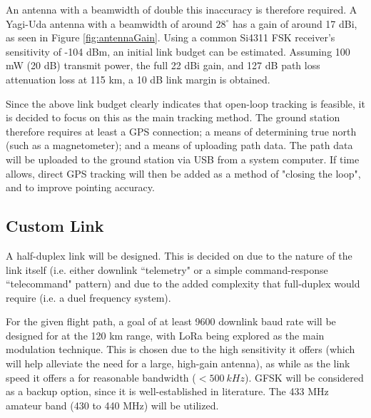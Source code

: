 An antenna with a beamwidth of double this inaccuracy is therefore required. A Yagi-Uda antenna with a beamwidth of around $28^\circ$ has a gain of around 17 dBi, as seen in Figure \ref{fig:antennaGain}. Using a common Si4311 FSK receiver's sensitivity of -104 dBm, an initial link budget can be estimated. Assuming 100 mW (20 dB) transmit power, the full 22 dBi gain, and 127 dB path loss attenuation loss at 115 km, a 10 dB link margin is obtained.

Since the above link budget clearly indicates that open-loop tracking is feasible, it is decided to focus on this as the main tracking method. The ground station therefore requires at least a GPS connection; a means of determining true north (such as a magnetometer); and a means of uploading path data. The path data will be uploaded to the ground station via USB from a system computer. If time allows, direct GPS tracking will then be added as a method of "closing the loop", and to improve pointing accuracy.

\subsection{Custom Link}
A half-duplex link will be designed. This is decided on due to the nature of the link itself (i.e. either downlink ``telemetry" or a simple command-response ``telecommand" pattern) and due to the added complexity that full-duplex would require (i.e. a duel frequency system).

For the given flight path, a goal of at least 9600 downlink baud rate will be designed for at the 120 km range, with LoRa being explored as the main modulation technique. This is chosen due to the high sensitivity it offers (which will help alleviate the need for a large, high-gain antenna), as while as the link speed it offers a for reasonable bandwidth ($< \SI{500}{kHz}$). GFSK will be considered as a backup option, since it is well-established in literature. The 433 MHz amateur band (430 to 440 MHz) will be utilized.